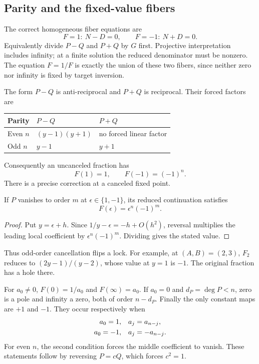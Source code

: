 \subsection{Parity and the fixed-value fibers}
The correct homogeneous fiber equations are
\begin{equation}\label{eq:fibers}
 F=1:\ N-D=0,\qquad F=-1:\ N+D=0.
\end{equation}
Equivalently divide \(P-Q\) and \(P+Q\) by \(G\) first. Projective interpretation includes infinity; at a finite solution the reduced denominator must be nonzero. The equation \(F=1/F\) is exactly the union of these two fibers, since neither zero nor infinity is fixed by target inversion.

The form \(P-Q\) is anti-reciprocal and \(P+Q\) is reciprocal. Their forced factors are
\begin{center}
\begin{tabular}{lll}\toprule
Parity & \(P-Q\) & \(P+Q\)\\\midrule
Even \(n\) & \((y-1)(y+1)\) & no forced linear factor\\
Odd \(n\) & \(y-1\) & \(y+1\)\\\bottomrule
\end{tabular}
\end{center}
Consequently an uncanceled fraction has
\begin{equation}\label{eq:locks}
 F(1)=1,\qquad F(-1)=(-1)^n.
\end{equation}
There is a precise correction at a canceled fixed point.

\begin{proposition}\label{prop:lock}
If \(P\) vanishes to order \(m\) at \(\epsilon\in\{1,-1\}\), its reduced continuation satisfies
\begin{equation}\label{eq:lock_continuation}
 F(\epsilon)=\epsilon^n(-1)^m.
\end{equation}
\end{proposition}
\begin{proof}
Put \(y=\epsilon+h\). Since \(1/y-\epsilon=-h+O(h^2)\), reversal multiplies the leading local coefficient by \(\epsilon^n(-1)^m\). Dividing gives the stated value.
\end{proof}
Thus odd-order cancellation flips a lock. For example, at \((A,B)=(2,3)\), \(F_2\) reduces to \((2y-1)/(y-2)\), whose value at \(y=1\) is \(-1\). The original fraction has a hole there.

For \(a_0\ne0\), \(F(0)=1/a_0\) and \(F(\infty)=a_0\). If \(a_0=0\) and \(d_P=\deg P<n\), zero is a pole and infinity a zero, both of order \(n-d_P\). Finally the only constant maps are \(+1\) and \(-1\). They occur respectively when
\begin{align}\label{eq:constant}
 a_0=1,&\quad a_j=a_{n-j},\notag\\
 a_0=-1,&\quad a_j=-a_{n-j}.
\end{align}
For even \(n\), the second condition forces the middle coefficient to vanish. These statements follow by reversing \(P=cQ\), which forces \(c^2=1\).

